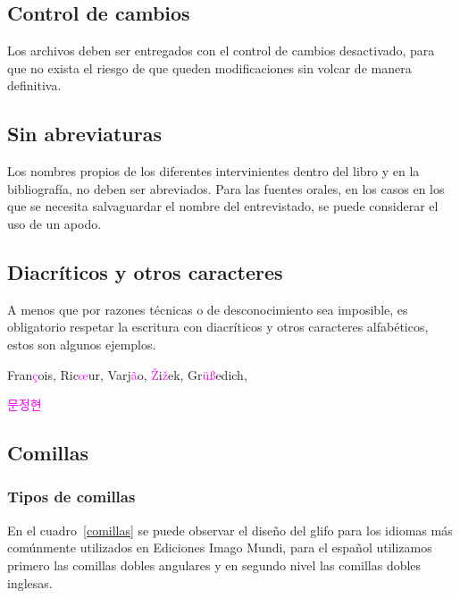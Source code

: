 \documentclass{book}
\begin{document}
{{{{\subsection{Control de cambios}

Los archivos deben ser entregados con el control de cambios desactivado, para que no exista el riesgo de que queden modificaciones sin volcar de manera definitiva.

\subsection{Sin abreviaturas}

Los nombres propios de los diferentes intervinientes dentro del libro y en la bibliografía, no deben ser abreviados. Para las fuentes orales, en los casos en los que se necesita salvaguardar el nombre del entrevistado, se puede considerar el uso de un apodo.

\subsection{Diacríticos y otros caracteres}

A menos que por razones técnicas o de desconocimiento sea imposible, es obligatorio respetar la escritura con diacríticos y otros caracteres alfabéticos, estos son algunos ejemplos.

\begin{mdframed}[linewidth=.5pt,linecolor=black!30,roundcorner=3pt,backgroundcolor=yellow!15]
\large\selectfont
\centering
Fran\textcolor{magenta}{ç}ois, Ric\textcolor{magenta}{\oe}{}ur, Varj\textcolor{magenta}{ã}o, \textcolor{magenta}{Ž}i\textcolor{magenta}{ž}ek, Gr\textcolor{magenta}{üß}edich, \begin{CJK}{UTF8}{mj}\textcolor{magenta}{문정현}\end{CJK}
\end{mdframed}

\subsection{Comillas}

\subsubsection{Tipos de comillas}

En el cuadro~\ref{comillas} se puede observar el diseño del \gls{glifo} para los idiomas más comúnmente utilizados en Ediciones Imago Mundi, para el español utilizamos primero las comillas dobles angulares y en segundo nivel las comillas dobles inglesas.

}}}}
\end{document}
